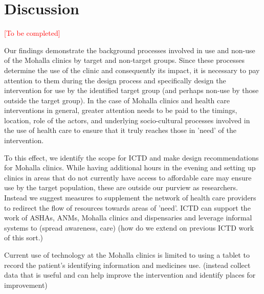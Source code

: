 \section{Discussion}

\textcolor{red}{[To be completed]}

Our findings demonstrate the background processes involved in use and non-use of the Mohalla clinics by target and non-target groups. Since these processes determine the use of the clinic and consequently its impact, it is necessary to pay attention to them during the design process and specifically design the intervention for use by the identified target group (and perhaps non-use by those outside the target group). In the case of Mohalla clinics and health care interventions in general, greater attention needs to be paid to the timings, location, role of the actors, and underlying socio-cultural processes involved in the use of health care to ensure that it truly reaches those in 'need' of the intervention.

To this effect, we identify the scope for ICTD and make design recommendations for Mohalla clinics. While having additional hours in the evening and setting up clinics in areas that do not currently have access to affordable care may ensure use by the target population, these are outside our purview as researchers. Instead we suggest measures to supplement the network of health care providers to redirect the flow of resources towards areas of 'need'. ICTD can support the work of ASHAs, ANMs, Mohalla clinics and dispensaries and leverage informal systems to (spread awareness, care) (how do we extend on previous ICTD work of this sort.)

Current use of technology at the Mohalla clinics is limited to using a tablet to record the patient's identifying information and medicines use. (instead collect data that is useful and can help improve the intervention and identify places for improvement)



